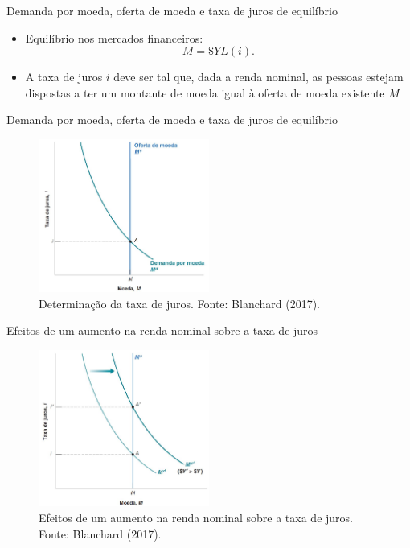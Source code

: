 \documentclass[10pt]{beamer}
\begin{document}
\begin{frame}{Demanda por moeda, oferta de moeda e taxa de juros de equilíbrio}
\begin{itemize}
    \item Equilíbrio nos mercados financeiros:
    \begin{equation}
        M = \$Y L(i).
        \label{eq3}
    \end{equation}
    \bigskip
    \item A taxa de juros $i$ deve ser tal que, dada a renda nominal, as pessoas estejam dispostas a ter um montante de moeda igual à oferta de moeda existente $M$
\end{itemize}
\end{frame}

\begin{frame}{Demanda por moeda, oferta de moeda e taxa de juros de equilíbrio}
\begin{figure}
    \centering
    \includegraphics[width=0.5\textwidth]{./figures/aula072_fig2.JPG}
    \caption{Determinação da taxa de juros. Fonte: Blanchard (2017).}
    \label{fig2}
\end{figure}
\end{frame}

\begin{frame}{Efeitos de um aumento na renda nominal sobre a taxa de juros}
    \begin{figure}
        \centering
        \includegraphics[width=0.5\textwidth]{./figures/aula072_fig3.JPG}
        \caption{Efeitos de um aumento na renda nominal sobre a taxa de juros. Fonte: Blanchard (2017).}
        \label{fig3}
    \end{figure}
\end{frame}
\end{document}
